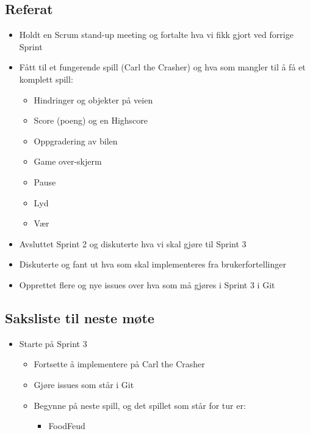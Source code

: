 \documentclass[11pt]{meetingmins}
\begin{document}
\maketitle
\subsection{Referat}
\begin{itemize}
	\item Holdt en Scrum stand-up meeting og fortalte hva vi fikk gjort ved forrige Sprint 
	\item F{\aa}tt til et fungerende spill (Carl the Crasher) og hva som mangler til {\aa} f{\aa} et komplett spill:
	\begin{itemize} 
		\item Hindringer og objekter p{\aa} veien 
		\item Score (poeng) og en Highscore
		\item Oppgradering av bilen 
		\item Game over-skjerm
		\item Pause
		\item Lyd 
		\item V{\ae}r 
	\end{itemize}
	\item Avsluttet Sprint 2 og diskuterte hva vi skal gjøre til Sprint 3
	\item Diskuterte og fant ut hva som skal implementeres fra brukerfortellinger 
	\item Opprettet flere og nye issues over hva som m{\aa} gjøres i Sprint 3 i Git 
\end{itemize}

\subsection{Saksliste til neste m{\o}te}
\begin{itemize}
	\item Starte på Sprint 3  
	\begin{itemize} 
		\item Fortsette {\aa} implementere p{\aa} Carl the Crasher
		\item Gj{\o}re issues som st{\aa}r i Git 
		\item Begynne p{\aa} neste spill, og det spillet som st{\aa}r for tur er:
		\begin{itemize}
			\item FoodFeud 
		\end{itemize}
	\end{itemize} 
\end{itemize}
\end{document}
